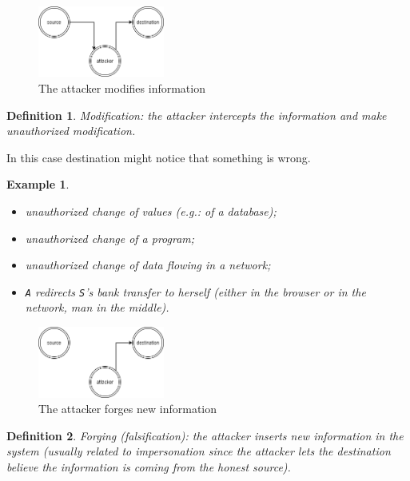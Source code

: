 \documentclass[a4paper, 12pt]{report}
\newtheorem{definition}{\textbf{Definition}}
\newtheorem{example}{\textbf{Example}}
\begin{document}
\begin{figure}
	\includegraphics[width=0.37\textwidth]{images/attacks4.png}
	\caption{The attacker modifies information}
	\label{fig:attacks4}
\end{figure}

\begin{definition}
	Modification: the attacker intercepts the information and make unauthorized modification.
\end{definition}

In this case destination might notice that something is wrong.
\begin{example}
	\leavevmode
	\begin{itemize}
		\item unauthorized change of values (e.g.: of a database);
		\item unauthorized change of a program;
		\item unauthorized change of data flowing in a network;
		\item \texttt{A} redirects \texttt{S}'s bank transfer to herself (either in the browser or in the network, man in the middle).
	\end{itemize}
\end{example}

\begin{figure}
	\includegraphics[width=0.37\textwidth]{images/attacks5.png}
	\caption{The attacker forges new information}
	\label{fig:attacks5}
\end{figure}

\begin{definition}
	Forging (falsification): the attacker inserts new information in the system (usually related to impersonation since the attacker lets the destination believe the information is coming from the honest source). 
\end{definition}
\end{document}
